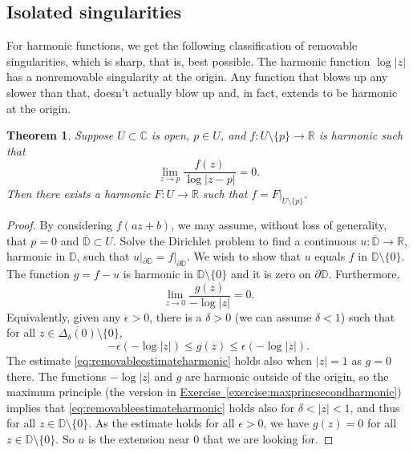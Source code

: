 \documentclass[12pt,openany]{book}
\newcommand{\sabs}[1]{\lvert {#1} \rvert}
\newcommand{\C}{{\mathbb{C}}}
\newcommand{\R}{{\mathbb{R}}}
\newcommand{\D}{{\mathbb{D}}}
\theoremstyle{plain}
\newtheorem{thm}{Theorem}[section]
\theoremstyle{remark}
\theoremstyle{definition}
\theoremstyle{exercise}
\theoremstyle{example}
\newcommand{\exerciseref}[1]{\hyperref[#1]{Exercise~\ref*{#1}}}
\begin{document}
\subsection{Isolated singularities}

For harmonic functions, we get the following classification of removable
singularities, which is sharp, that is, best possible.
The harmonic function $\log \sabs{z}$
has a nonremovable singularity at the origin.
Any function
that blows up any slower than that, doesn't actually blow up and, in fact,
extends to be
harmonic at the origin.

\begin{thm}
Suppose $U \subset \C$ is open, $p \in U$, and $f \colon U \setminus \{ p \}
\to \R$ is harmonic such that
\begin{equation*}
\lim_{z\to p} \frac{f(z)}{\log \sabs{z-p}} = 0 .
\end{equation*}
Then there exists a harmonic $F \colon U \to \R$ such that
$f = F|_{U \setminus \{ p \}}$.
\end{thm}

\begin{proof}
By considering $f(a z + b)$, we may assume, without loss of generality,
that $p = 0$ and $\overline{\D} \subset U$.  Solve the Dirichlet problem
to find a continuous $u \colon \overline{\D} \to \R$,
harmonic in $\D$, such that $u|_{\partial \D} = f|_{\partial \D}$.
We wish to show that $u$ equals $f$ in $\D \setminus \{0\}$.
The function
$g = f - u$ is harmonic in $\D \setminus \{ 0 \}$ and it is zero on
$\partial \D$.  Furthermore,
\begin{equation*}
\lim_{z \to 0} \frac{g(z)}{-\log \sabs{z}} = 0.
\end{equation*}
Equivalently, given any $\epsilon > 0$, there is a $\delta > 0$
(we can assume $\delta < 1$)
such that for all $z \in \overline{\Delta_\delta(0)} \setminus \{ 0 \}$,
\begin{equation} \label{eq:removableestimateharmonic}
-\epsilon (- \log\sabs{z})
\leq
g(z)
\leq
\epsilon (- \log\sabs{z}) .
\end{equation}
The estimate \eqref{eq:removableestimateharmonic} holds also when
$\sabs{z}=1$ as $g=0$ there.
The functions $-\log\sabs{z}$ and $g$ are harmonic
outside of the origin, so
the maximum principle (the version in
\exerciseref{exercise:maxprincsecondharmonic}) implies that
\eqref{eq:removableestimateharmonic} holds also for $\delta < \sabs{z} < 1$,
and thus for all $z \in \D \setminus \{ 0 \}$.
As the estimate holds for all $\epsilon > 0$, we have $g(z) = 0$ for all
$z \in \D \setminus \{0\}$.  So $u$ is the extension near $0$ that
we are looking for.
\end{proof}
\end{document}
